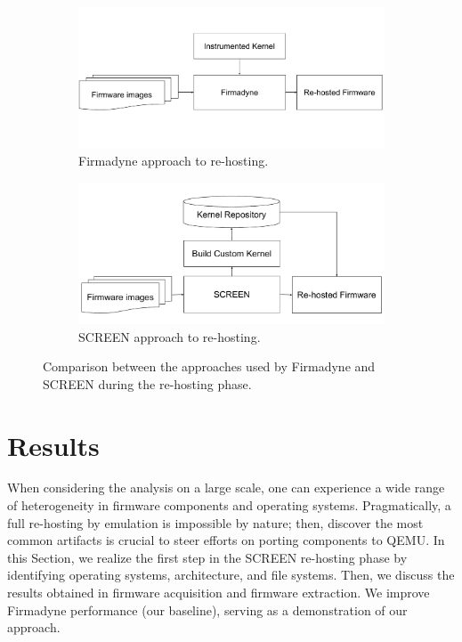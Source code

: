 \documentclass[12pt]{article}
\begin{document}
\begin{figure}[h]
     \centering
     \begin{subfigure}[b]{0.45\textwidth}
         \centering
         \includegraphics[width=\textwidth]{figs/Firmadyne-Approach.pdf}
         \caption{Firmadyne approach to re-hosting.}
         \label{fig:firmadyne-approach}
     \end{subfigure}
     \hfill
     \begin{subfigure}[b]{0.45\textwidth}
         \centering
         \includegraphics[width=\textwidth]{figs/SCREEN-Approach.pdf}
         \caption{SCREEN approach to re-hosting.}
         \label{fig:screen-approach}
     \end{subfigure}
        \caption{Comparison between the approaches used by Firmadyne and SCREEN during the re-hosting phase.}
        \label{fig:firmadyne-screen-compare}
\end{figure}

\section{Results}
\label{sec:results}

When considering the analysis on a large scale, one can experience a wide range of heterogeneity in firmware components and operating systems.  Pragmatically, a full re-hosting by emulation is impossible by nature; then, discover the most common artifacts is crucial to steer efforts on porting components to QEMU.  In this Section, we realize the first step in the SCREEN re-hosting phase by identifying operating systems, architecture, and file systems. Then, we discuss the results obtained in firmware acquisition and firmware extraction. We improve Firmadyne performance (our baseline), serving as a demonstration of our approach.
\end{document}

